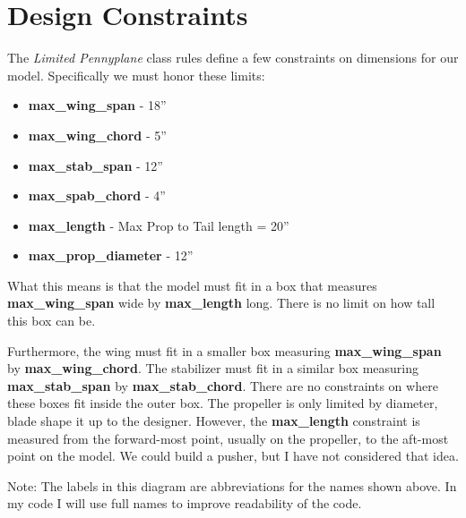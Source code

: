 \section*{Design Constraints}

The {\it Limited Pennyplane} class rules define a few constraints on dimensions
for our model. Specifically we must honor these limits:

\begin{itemize}
\item{{\bf max\_wing\_span} -  18''}
\item{{\bf max\_wing\_chord} -  5''}
\item{{\bf max\_stab\_span} - 12''}
\item{{\bf max\_spab\_chord} - 4''}
\item{{\bf max\_length} - Max Prop to Tail length = 20''}
\item{{\bf max\_prop\_diameter} - 12''}
\end{itemize}

What this means is that the model must fit in a box that measures {\bf
max\_wing\_span} wide by {\bf max\_length} long. There is no limit on how
tall this box can be.

Furthermore, the wing must fit in a smaller box measuring {\bf max\_wing\_span}
by {\bf max\_wing\_chord}. The stabilizer must fit in a similar box measuring
{\bf max\_stab\_span} by {\bf max\_stab\_chord}. There are no constraints on where
these boxes fit inside the outer box. The propeller is only limited by
diameter, blade shape it up to the designer. However, the {\bf max\_length}
constraint is measured from the forward-most point, usually on the propeller,
to the aft-most point on the model. We could build a pusher, but I have not
considered that idea.


Note: The labels in this diagram are abbreviations for the names shown above.
In my code I will use full names to improve readability of the code.
